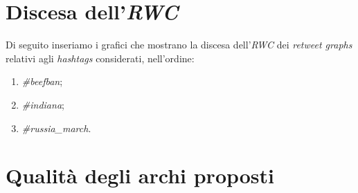\section{Discesa dell'\textit{RWC}}

Di seguito inseriamo i grafici che mostrano la discesa dell'\textit{RWC} dei \textit{retweet graphs} relativi agli \textit{hashtags} considerati, nell'ordine:
\begin{enumerate}
\item \textit{\#beefban};
\item \textit{\#indiana};
\item \textit{\#russia\_march}.
\end{enumerate}





\section{Qualità degli archi proposti}
